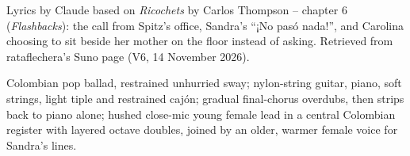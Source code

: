 
\begin{notes}
Lyrics by Claude based on \emph{Ricochets} by Carlos Thompson -- chapter 6 (\emph{Flashbacks}): the call from Spitz's office, Sandra's ``¡No pasó nada!'', and Carolina choosing to sit beside her mother on the floor instead of asking. Retrieved from rataflechera's Suno page (V6, 14 November 2026).
\end{notes}
\begin{style}
Colombian pop ballad, restrained unhurried sway; nylon-string guitar, piano, soft strings, light tiple and restrained cajón; gradual final-chorus overdubs, then strips back to piano alone; hushed close-mic young female lead in a central Colombian register with layered octave doubles, joined by an older, warmer female voice for Sandra’s lines.
\end{style}
